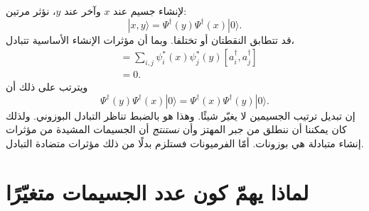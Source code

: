لإنشاء جسيم عند \(x\) وآخر عند \(y\)، نؤثر مرتين:
\begin{equation}
|x,y\rangle
=\Psi^\dagger(y)\Psi^\dagger(x)|0\rangle.
\label{eq:l06-two-particle-state}
\end{equation}
قد تتطابق النقطتان أو تختلفا. وبما أن مؤثرات الإنشاء الأساسية تتبادل،
\begin{align}
[\Psi^\dagger(x),\Psi^\dagger(y)]
&=\sum_{i,j}\psi_i^*(x)\psi_j^*(y)
[a_i^\dagger,a_j^\dagger] \\
&=0.
\end{align}
ويترتب على ذلك أن
\begin{equation}
\Psi^\dagger(y)\Psi^\dagger(x)|0\rangle
=\Psi^\dagger(x)\Psi^\dagger(y)|0\rangle.
\label{eq:l06-boson-exchange}
\end{equation}
إن تبديل ترتيب الجسيمين لا يغيّر شيئًا. وهذا هو بالضبط تناظر التبادل البوزوني. ولذلك كان يمكننا أن ننطلق من جبر المهتز وأن \emph{نستنتج} أن الجسيمات المشيدة من مؤثرات إنشاء متبادلة هي بوزونات. أمّا الفرميونات فستلزم بدلًا من ذلك مؤثرات متضادة التبادل.

\begin{classroomqa}
\end{classroomqa}

\begin{classroomqa}
\end{classroomqa}

\begin{classroomqa}
\end{classroomqa}

\section{لماذا يهمّ كون عدد الجسيمات متغيّرًا}

